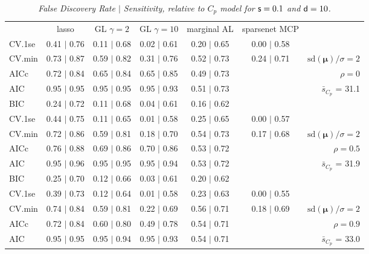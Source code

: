 \documentclass[12pt]{article}
\newcommand{\mr}[1]{\mathrm{#1}}
\newcommand{\bm}[1]{\mathbf{#1}}
\begin{document}
\begin{table}[p]\vspace{-.5cm}
\caption[l]{\label{sens}\it False Discovery Rate $\mid$ Sensitivity, relative to $C_p$ model  for ${\sf s}=0.1$ and ${\sf d}=10$.}
\vspace{-.5cm}
\small{}
\begin{center}
\begin{tabular}{l*{5}{c}|r}
 & lasso & GL $\gamma=2$ & GL $\gamma=10$ & marginal AL & sparsenet MCP  & \\
 \cline{1-7}
CV.1se & 0.41 $\mid$ 0.76 & 0.11 $\mid$ 0.68 & 0.02 $\mid$ 0.61 & 0.20 $\mid$ 0.65 & 0.00 $\mid$ 0.58 &\\
CV.min & 0.73 $\mid$ 0.87 & 0.59 $\mid$ 0.82 & 0.31 $\mid$ 0.76 & 0.52 $\mid$ 0.73 & 0.24 $\mid$ 0.71 &  $\mr{sd}(\bm{\mu})/\sigma=2$ \\
AICc & 0.72 $\mid$ 0.84 & 0.65 $\mid$ 0.84 & 0.65 $\mid$ 0.85 & 0.49 $\mid$ 0.73 & & $\rho=0$ \\
AIC & 0.95 $\mid$ 0.95 & 0.95 $\mid$ 0.95 & 0.95 $\mid$ 0.93 & 0.51 $\mid$ 0.73 & & \multirow{2}{*}{$\bar{s}_{C_p}$ = 31.1} \\
BIC & 0.24 $\mid$ 0.72 & 0.11 $\mid$ 0.68 & 0.04 $\mid$ 0.61 & 0.16 $\mid$ 0.62 & & \\
 \hline 
CV.1se & 0.44 $\mid$ 0.75 & 0.11 $\mid$ 0.65 & 0.01 $\mid$ 0.58 & 0.25 $\mid$ 0.65 & 0.00 $\mid$ 0.57 &\\
CV.min & 0.72 $\mid$ 0.86 & 0.59 $\mid$ 0.81 & 0.18 $\mid$ 0.70 & 0.54 $\mid$ 0.73 & 0.17 $\mid$ 0.68 &  $\mr{sd}(\bm{\mu})/\sigma=2$ \\
AICc & 0.76 $\mid$ 0.88 & 0.69 $\mid$ 0.86 & 0.70 $\mid$ 0.86 & 0.53 $\mid$ 0.72 & & $\rho=0.5$ \\
AIC & 0.95 $\mid$ 0.96 & 0.95 $\mid$ 0.95 & 0.95 $\mid$ 0.94 & 0.53 $\mid$ 0.72 & & \multirow{2}{*}{$\bar{s}_{C_p}$ = 31.9} \\
BIC & 0.25 $\mid$ 0.70 & 0.12 $\mid$ 0.66 & 0.03 $\mid$ 0.61 & 0.20 $\mid$ 0.62 & & \\
 \hline 
CV.1se & 0.39 $\mid$ 0.73 & 0.12 $\mid$ 0.64 & 0.01 $\mid$ 0.58 & 0.23 $\mid$ 0.63 & 0.00 $\mid$ 0.55 &\\
CV.min & 0.74 $\mid$ 0.84 & 0.59 $\mid$ 0.81 & 0.22 $\mid$ 0.69 & 0.56 $\mid$ 0.71 & 0.18 $\mid$ 0.69 &  $\mr{sd}(\bm{\mu})/\sigma=2$ \\
AICc & 0.72 $\mid$ 0.84 & 0.60 $\mid$ 0.80 & 0.49 $\mid$ 0.78 & 0.54 $\mid$ 0.71 & & $\rho=0.9$ \\
AIC & 0.95 $\mid$ 0.95 & 0.95 $\mid$ 0.94 & 0.95 $\mid$ 0.93 & 0.54 $\mid$ 0.71 & & \multirow{2}{*}{$\bar{s}_{C_p}$ = 33.0} \\

\end{tabular}
\end{center}
\end{table}
\end{document}
